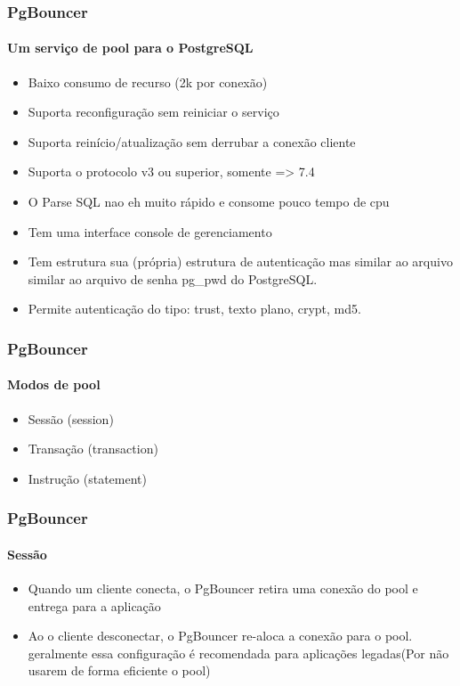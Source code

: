 \documentclass{beamer}
\begin{document}
\begin{frame}
    \frametitle{\textbf{PgBouncer}}
    \framesubtitle{Um serviço de pool para o PostgreSQL}
      \begin{itemize}
      \item Baixo consumo de recurso (2k por conexão)
      \item Suporta reconfiguração sem reiniciar o serviço
      \item Suporta reinício/atualização sem derrubar a conexão cliente
      \item Suporta o protocolo v3 ou superior, somente => \alert{7.4}
      \item O Parse \alert{SQL} nao eh muito rápido e consome pouco tempo de cpu
      \item Tem uma interface console de gerenciamento 
      \item Tem estrutura sua (própria) estrutura de autenticação mas similar ao arquivo similar ao arquivo de senha pg\_pwd do PostgreSQL.
      \item Permite autenticação do tipo: trust, texto plano, crypt, md5.
      \end{itemize}

\end{frame}

\begin{frame}
    \frametitle{\textbf{PgBouncer}}
    \framesubtitle{Modos de pool}
        \begin{itemize}
	 \item Sessão (session)
         \item Transação (transaction)
         \item Instrução (statement)
	\end{itemize}
\end{frame}

\begin{frame}
    \frametitle{\textbf{PgBouncer}}
    \framesubtitle{Sessão}
      \begin{itemize}
        \item Quando um cliente conecta, o PgBouncer retira uma conexão do pool e entrega para a aplicação
	\item Ao o cliente desconectar, o PgBouncer re-aloca a conexão para o pool. geralmente essa configuração é recomendada para aplicações legadas(Por não usarem de forma eficiente o pool)
      \end{itemize}


\end{frame}
\end{document}
